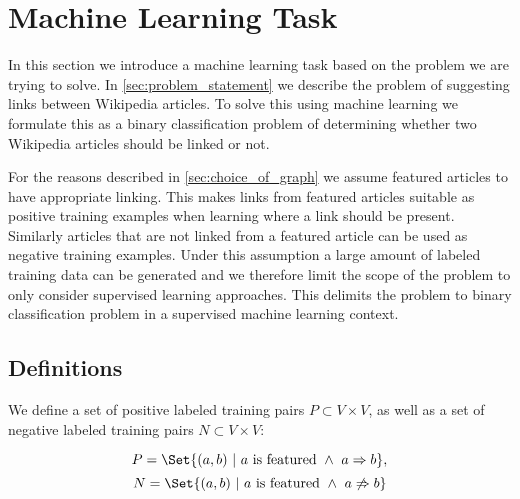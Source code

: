 \section{Machine Learning Task}\label{sec:machine_learning_task}
In this section we introduce a machine learning task based on the problem we are trying to solve. In \cref{sec:problem_statement} we describe the problem of suggesting links between Wikipedia articles. To solve this using machine learning we formulate this as a binary classification problem of determining whether two Wikipedia articles should be linked or not.

For the reasons described in \cref{sec:choice_of_graph} we assume featured articles to have appropriate linking. This makes links from featured articles suitable as positive training examples when learning where a link should be present. Similarly articles that are not linked from a featured article can be used as negative training examples.
Under this assumption a large amount of labeled training data can be generated and we therefore limit the scope of the problem to only consider supervised learning approaches. This delimits the problem to binary classification problem in a supervised machine learning context. 



\subsection{Definitions}
We define a set of positive labeled training pairs $P \subset V \times V$, as well as a set of negative labeled training pairs $N \subset V \times V$:

$$P = \Set{(a,b)\ |\ a\text{ is featured}\ \wedge\ a \Rightarrow b},$$
$$N = \Set{(a,b)\ |\ a\text{ is featured}\ \wedge\ a \not\Rightarrow b}$$


